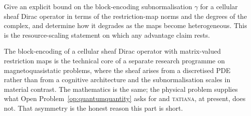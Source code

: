 \begin{openproblem}
Give an explicit bound on the block-encoding subnormalisation $\gamma$
for a cellular sheaf Dirac operator in terms of the restriction-map
norms and the degrees of the complex, and determine how it degrades as
the maps become heterogeneous. This is the resource-scaling statement on
which any advantage claim rests.
\end{openproblem}

\begin{remark}
The block-encoding of a cellular sheaf Dirac operator with matrix-valued
restriction maps is the technical core of a separate research programme
on magnetoquasistatic problems, where the sheaf arises from a
discretised PDE rather than from a cognitive architecture and the
subnormalisation scales in material contrast. The mathematics is the
same; the physical problem supplies what
Open Problem~\ref{op:quantumquantity} asks for and \textsc{tatiana},
at present, does not. That asymmetry is the honest reason this part is
short.
\end{remark}
